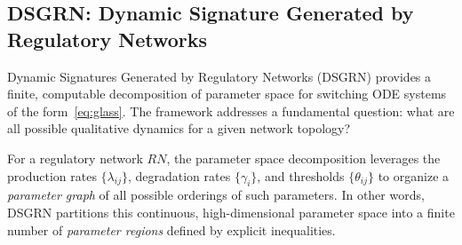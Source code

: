 \documentclass[11pt]{article}
\begin{document}
\subsection{DSGRN: Dynamic Signature Generated by Regulatory Networks}

Dynamic Signatures Generated by Regulatory Networks (DSGRN) \cite{cummins2018,cummins2019, rookfields} provides a finite, computable decomposition of parameter space for switching ODE systems of the form~\eqref{eq:glass}. The framework addresses a fundamental question: what are all possible qualitative dynamics for a given network topology?

For a regulatory network $RN$, the parameter space decomposition leverages the production rates $\{\lambda_{ij}\}$, degradation rates $\{\gamma_i\}$, and thresholds $\{\theta_{ij}\}$ to organize a \emph{parameter graph} of all possible orderings of such parameters. In other words, DSGRN partitions this continuous, high-dimensional parameter space into a finite number of \textit{parameter regions} defined by explicit inequalities. 
\end{document}
